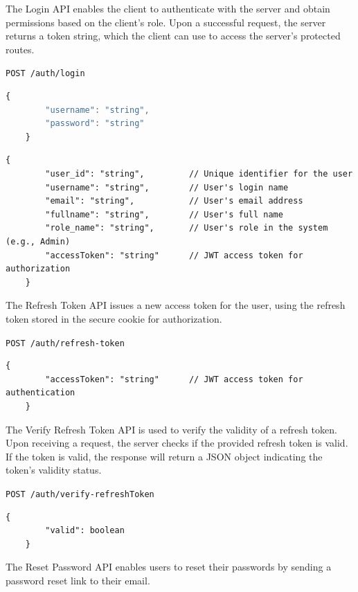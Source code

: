 	
The Login API enables the client to authenticate with the server and obtain permissions based on the client’s role. Upon a successful request, the server returns a token string, which the client can use to access the server's protected routes.

\texttt{POST /auth/login}
\begin{lstlisting}[language=Javascript, caption=Request body of Login API]
	{
		"username": "string",
		"password": "string"
	}
\end{lstlisting}



\begin{lstlisting}[breaklines=true, caption=Response of Login API]
	{
		"user_id": "string",         // Unique identifier for the user
		"username": "string",        // User's login name
		"email": "string",           // User's email address
		"fullname": "string",        // User's full name
		"role_name": "string",       // User's role in the system (e.g., Admin)
		"accessToken": "string"      // JWT access token for authorization
	}
\end{lstlisting}

\vspace*{0.5cm}
The Refresh Token API issues a new access token for the user, using the refresh token stored in the secure cookie for authorization.

\texttt{POST /auth/refresh-token}
\begin{lstlisting}[breaklines=true, caption=Response of Refresh Token API]
	{
		"accessToken": "string"      // JWT access token for authentication
	}
\end{lstlisting}

\vspace*{0.5cm}

The Verify Refresh Token API is used to verify the validity of a refresh token. Upon receiving a request, the server checks if the provided refresh token is valid. If the token is valid, the response will return a JSON object indicating the token's validity status.
	
\texttt{POST /auth/verify-refreshToken}
\begin{lstlisting}[breaklines=true, caption=Response of Verify Refresh Token API]
	{
		"valid": boolean   
	}
\end{lstlisting}



\newpage
The Reset Password API enables users to reset their passwords by sending a password reset link to their email. 

